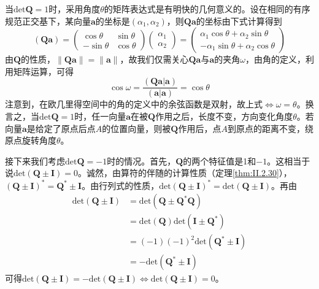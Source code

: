 \documentclass[main.tex]{subfiles}
\begin{document}
当$\mathrm{det}\mathbf{Q}=1$时，采用角度$\theta$的矩阵表达式是有明快的几何意义的。设在相同的有序规范正交基下，某向量$\mathbf{a}$的坐标是$\left(\alpha_1,\alpha_2\right)$，则$\mathbf{Qa}$的坐标由下式计算得到
\[\left(\mathbf{Qa}\right)=\left(\begin{array}{cc}\cos\theta&\sin\theta\\-\sin\theta&\cos\theta\end{array}\right)\left(\begin{array}{c}\alpha_1\\\alpha_2\end{array}\right)=\left(\begin{array}{c}\alpha_1\cos\theta+\alpha_2\sin\theta\\-\alpha_1\sin\theta+\alpha_2\cos\theta\end{array}\right)\]
由$\mathbf{Q}$的性质，$\left\|\mathbf{Qa}\right\|=\left\|\mathbf{a}\right\|$，故我们仅需关心$\mathbf{Qa}$与$\mathbf{a}$的夹角$\omega$，由角的定义，利用矩阵运算，可得
\[
    \cos\omega=\frac{\left(\mathbf{Qa}|\mathbf{a}\right)}{\left(\mathbf{a}|\mathbf{a}\right)}=\cos\theta
\]
注意到，在欧几里得空间中的角的定义中的余弦函数是双射，故上式$\Leftrightarrow\omega=\theta$。换言之，当$\mathrm{det}\mathbf{Q}=1$时，任一向量$\mathbf{a}$在被$\mathbf{Q}$作用之后，长度不变，方向变化角度$\theta$。若向量$\mathbf{a}$是给定了原点后点$A$的位置向量，则被$\mathbf{Q}$作用后，点$A$到原点的距离不变，绕原点旋转角度$\theta$。

接下来我们考虑$\mathrm{det}\mathbf{Q}=-1$时的情况。首先，$\mathbf{Q}$的两个特征值是1和$-1$。这相当于说$\mathrm{det}\left(\mathbf{Q}\pm\mathbf{I}\right)=0$。诚然，由算符的伴随的计算性质（定理\ref{thm:II.2.30}），$\left(\mathbf{Q}\pm\mathbf{I}\right)^*=\mathbf{Q}^*\pm\mathbf{I}$。由行列式的性质，$\mathrm{det}\left(\mathbf{Q}\pm\mathbf{I}\right)^*=\mathrm{det}\left(\mathbf{Q}\pm\mathbf{I}\right)$。再由
\begin{align*}
    \mathrm{det}\left(\mathbf{Q}\pm\mathbf{I}\right) & =\mathrm{det}\left(\mathbf{Q}\pm\mathbf{Q}^*\mathbf{Q}\right)                          \\
                                                     & =\mathrm{det}\left(\mathbf{Q}\right)\mathrm{det}\left(\mathbf{I}\pm\mathbf{Q}^*\right) \\
                                                     & =\left(-1\right)\left(-1\right)^2\mathrm{det}\left(\mathbf{Q}^*\pm\mathbf{I}\right)    \\
                                                     & =-\mathrm{det}\left(\mathbf{Q}^*\pm\mathbf{I}\right)
\end{align*}
可得$\mathrm{det}\left(\mathbf{Q}\pm\mathbf{I}\right)=-\mathrm{det}\left(\mathbf{Q}\pm\mathbf{I}\right)\Leftrightarrow\mathrm{det}\left(\mathbf{Q}\pm\mathbf{I}\right)=0$。
\end{document}
